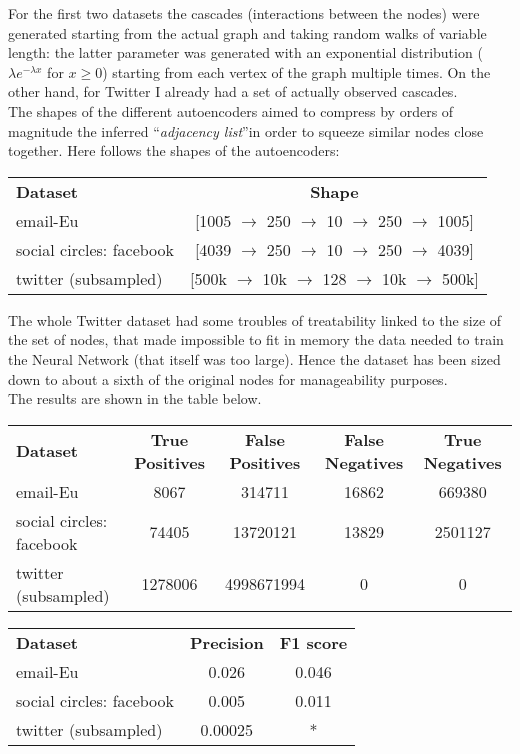 \documentclass{article}
\begin{document}
				\bigskip
				For the first two datasets the cascades (interactions between the nodes) were generated starting from the actual graph and taking random walks of variable length: the latter parameter was generated with an exponential distribution ($\lambda e^{-\lambda x}$ for $x\ge 0$) starting from each vertex of the graph multiple times. On the other hand, for Twitter I already had a set of actually observed cascades.\smallskip\\
				The shapes of the different autoencoders aimed to compress by orders of magnitude the inferred \textquotedblleft \textit{adjacency list}\textquotedblright in order to squeeze similar nodes close together. Here follows the shapes of the autoencoders:
				\begin{center}
					\begin{tabular}{l | c}
						\textbf{Dataset} & \textbf{Shape} \\
						email-Eu & [1005 $\rightarrow$ 250 $\rightarrow$ 10 $\rightarrow$ 250 $\rightarrow$ 1005] \\
						social circles: facebook & [4039 $\rightarrow$ 250 $\rightarrow$ 10 $\rightarrow$ 250 $\rightarrow$ 4039]  \\
						twitter (subsampled) & [500k $\rightarrow$ 10k $\rightarrow$ 128 $\rightarrow$ 10k $\rightarrow$ 500k]
					\end{tabular}	
				\end{center}
				The whole Twitter dataset had some troubles of treatability linked to the size of the set of nodes, that made impossible to fit in memory the data needed to train the Neural Network (that itself was too large). Hence the dataset has been sized down to about a sixth of the original nodes for manageability purposes.\\
				The results are shown in the table below.
				
				\begin{center}
					\begin{tabular}{l | c | c | c | c }
						\textbf{Dataset} & \textbf{True Positives} & \textbf{False Positives} & \textbf{False Negatives} & \textbf{True Negatives}  \\
						email-Eu &  8067 & 314711 & 16862 & 669380\\
						social circles: facebook & 74405 &	13720121 & 13829 & 2501127\\
						twitter (subsampled) & 1278006 & 4998671994 & 0 & 0
					\end{tabular}	
				\end{center}
				\hskip0.0cm
				\begin{tabular}{l | c | c}
					\textbf{Dataset} & \textbf{Precision} & \textbf{F1 score} \\
					email-Eu &  0.026 & 0.046\\
					social circles: facebook & 0.005 &	0.011\\
					twitter (subsampled) & 0.00025 & *
				\end{tabular}	
			
\end{document}
